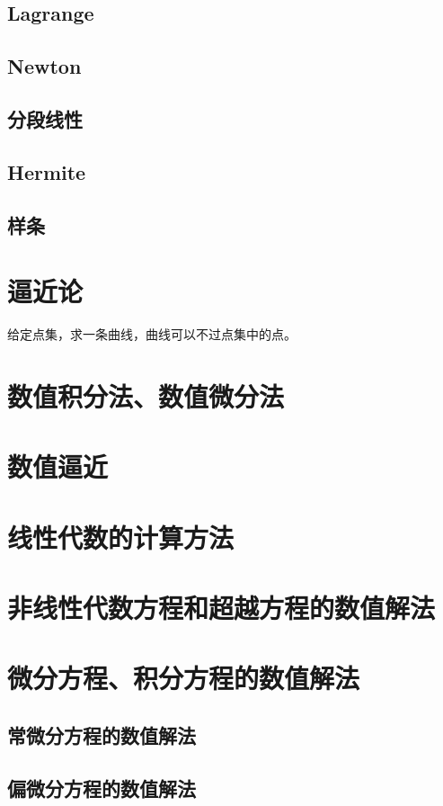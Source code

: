 \documentclass[UTF8]{../09-Mathematics}
\begin{document}
\section{Lagrange}
\section{Newton}
\section{分段线性}
\section{Hermite}
\section{样条}



\chapter{逼近论}
给定点集，求一条曲线，曲线可以不过点集中的点。


\chapter{数值积分法、数值微分法}
\chapter{数值逼近}
\chapter{线性代数的计算方法}
\chapter{非线性代数方程和超越方程的数值解法}



\chapter{微分方程、积分方程的数值解法}
    \section{常微分方程的数值解法}
    \section{偏微分方程的数值解法}
\end{document}
